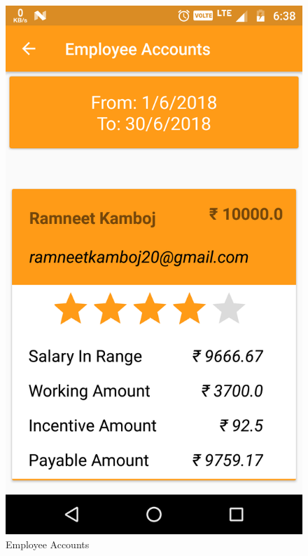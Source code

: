 \\
\begin{figure}[h]
	\centering
	\includegraphics[width=0.7\linewidth]{EmployeeAccounts}
	\caption{Employee Accounts}
\end{figure}
\pagebreak

